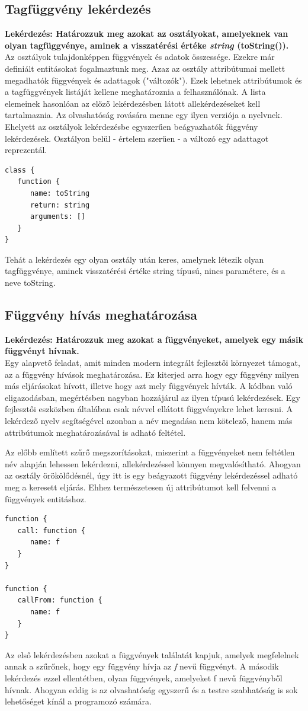 \documentclass[a4paper,12pt]{report}
\begin{document}
\subsection{Tagfüggvény lekérdezés}
\textbf{Lekérdezés: Határozzuk meg azokat az osztályokat, amelyeknek van olyan tagfüggvénye, aminek a visszatérési értéke \textit{string} (toString()).}
\\
Az osztályok tulajdonképpen függvények és adatok összessége. Ezekre már definiált entitásokat fogalmaztunk meg. Azaz az osztály attribútumai mellett megadhatók függvények és adattagok ("változók"). Ezek lehetnek attribútumok és a tagfüggvények listáját kellene meghatároznia a felhasználónak. A lista elemeinek hasonlóan az előző lekérdezésben látott allekérdezéseket kell tartalmaznia. Az olvashatóság rovására menne egy ilyen verziója a nyelvnek. Ehelyett az osztályok lekérdezésbe egyszerűen beágyazhatók függvény lekérdezések. Osztályon belül - értelem szerűen - a változó egy adattagot reprezentál.
\begin{verbatim}
class {
   function {
      name: toString
      return: string
      arguments: []
   }
}
\end{verbatim}
Tehát a lekérdezés egy olyan osztály után keres, amelynek létezik olyan tagfüggvénye, aminek visszatérési értéke string típusú, nincs paramétere, és a neve toString.
\subsection{Függvény hívás meghatározása}
\textbf{Lekérdezés: Határozzuk meg azokat a függvényeket, amelyek egy másik függvényt hívnak.}
\\
Egy alapvető feladat, amit minden modern integrált fejlesztői környezet támogat, az a függvény hívások meghatározása. Ez kiterjed arra hogy egy függvény milyen más eljárásokat hívott, illetve hogy azt mely függvények hívták. A kódban való eligazodásban, megértésben nagyban hozzájárul az ilyen típusú lekérdezések. Egy fejlesztői eszközben általában csak névvel ellátott függvényekre lehet keresni. A lekérdező nyelv segítségével azonban a név megadása nem kötelező, hanem más attribútumok meghatározásával is adható feltétel.
\par  Az előbb említett szűrő megszorításokat, miszerint a függvényeket nem feltétlen név alapján lehessen lekérdezni, allekérdezéssel könnyen megvalósítható. Ahogyan az osztály örökölődésnél, úgy itt is egy beágyazott függvény lekérdezéssel adható meg a keresett eljárás. Ehhez természetesen új attribútumot kell felvenni a függvények entitáshoz.
\begin{verbatim}
function {
   call: function { 
      name: f 
   }
}

function {
   callFrom: function { 
      name: f 
   }
}
\end{verbatim}
\par Az első lekérdezésben azokat a függvények találatát kapjuk, amelyek megfelelnek annak a szűrőnek, hogy egy függvény hívja az \textit{f} nevű függvényt. A második lekérdezés ezzel ellentétben, olyan függvények, amelyeket f nevű függvényből hívnak. Ahogyan eddig is az olvashatóság egyszerű és a testre szabhatóság is sok lehetőséget kínál a programozó számára.
\end{document}
